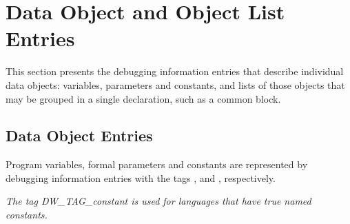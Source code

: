 \chapter[Data Object and Object List]{Data Object and Object List Entries}
\label{chap:dataobjectandobjectlistentries}

This section presents the debugging information entries that
describe individual data objects: variables, parameters and
constants, and lists of those objects that may be grouped in
a single declaration, such as a common block.

\section{Data Object Entries}
\label{chap:dataobjectentries}


Program variables, formal parameters and constants are
represented by debugging information entries with the tags
, 
 and 
,
respectively.

\textit{The tag DW\_TAG\_constant is used for languages that
have true named constants.}

